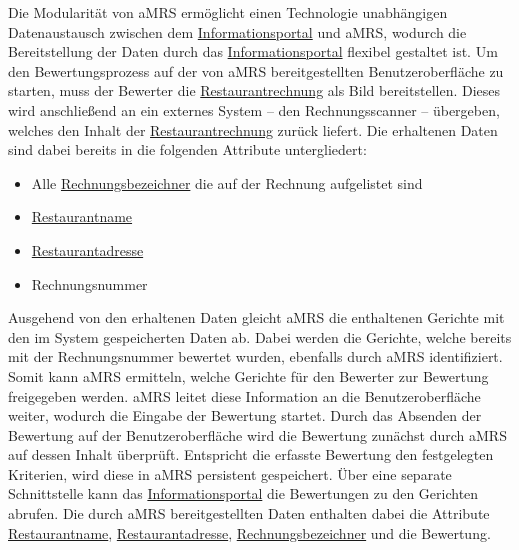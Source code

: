 Die Modularität von \ac{aMRS} ermöglicht einen Technologie unabhängigen Datenaustausch zwischen dem \hyperref[gls:informationsportal]{Informationsportal} und \ac{aMRS}, wodurch die Bereitstellung der Daten durch das \hyperref[gls:informationsportal]{Informationsportal} flexibel gestaltet ist.
\newparagraph
Um den Bewertungsprozess auf der von \ac{aMRS} bereitgestellten Benutzeroberfläche zu starten, muss der Bewerter die \hyperref[gls:restaurantRechnung]{Restaurantrechnung} als Bild bereitstellen.
Dieses wird anschließend an ein externes System -- den Rechnungsscanner -- übergeben, welches den Inhalt der \hyperref[gls:restaurantRechnung]{Restaurantrechnung} zurück liefert.
Die erhaltenen Daten sind dabei bereits in die folgenden Attribute untergliedert:
\begin{itemize}
    \item Alle \hyperref[gls:Rechnungsbezeichner]{Rechnungsbezeichner} die auf der Rechnung aufgelistet sind
    \item \hyperref[gls:restaurantname]{Restaurantname}
    \item \hyperref[gls:restaurantadresse]{Restaurantadresse}
    \item Rechnungsnummer
\end{itemize}
Ausgehend von den erhaltenen Daten gleicht \ac{aMRS} die enthaltenen Gerichte mit den im System gespeicherten Daten ab.
Dabei werden die Gerichte, welche bereits mit der Rechnungsnummer bewertet wurden, ebenfalls durch \ac{aMRS} identifiziert.
Somit kann \ac{aMRS} ermitteln, welche Gerichte für den Bewerter zur Bewertung freigegeben werden.
\ac{aMRS} leitet diese Information an die Benutzeroberfläche weiter, wodurch die Eingabe der Bewertung startet.
\newparagraph
Durch das Absenden der Bewertung auf der Benutzeroberfläche wird die Bewertung zunächst durch \ac{aMRS} auf dessen Inhalt überprüft.
Entspricht die erfasste Bewertung den festgelegten Kriterien, wird diese in \ac{aMRS} persistent gespeichert.
\newparagraph
Über eine separate Schnittstelle kann das \hyperref[gls:informationsportal]{Informationsportal} die Bewertungen zu den Gerichten abrufen.
Die durch \ac{aMRS} bereitgestellten Daten enthalten dabei die Attribute \hyperref[gls:restaurantname]{Restaurantname}, \hyperref[gls:restaurantadresse]{Restaurantadresse}, \hyperref[gls:Rechnungsbezeichner]{Rechnungsbezeichner} und die Bewertung.

